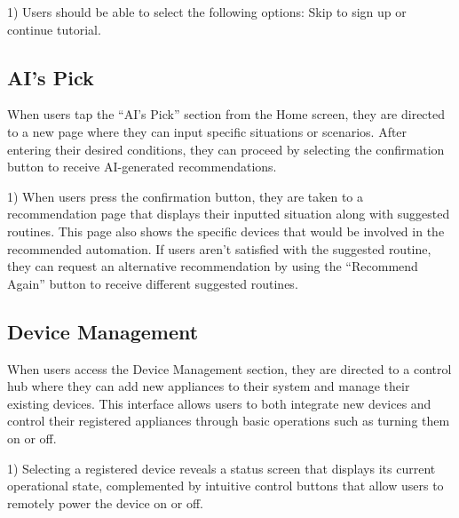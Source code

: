 \documentclass[conference]{IEEEtran}
\begin{document}
1) Users should be able to select the following options: Skip to sign up or continue tutorial.

\vspace{0.7em} %

\subsection{AI's Pick}
\vspace{0.5em}
When users tap the “AI's Pick” section from the Home screen, they are directed to a new page where they can input specific situations or scenarios. After entering their desired conditions, they can proceed by selecting the confirmation button to receive AI-generated recommendations.
\vspace{0.5em}

1) When users press the confirmation button, they are taken to a recommendation page that displays their inputted situation along with suggested routines. This page also shows the specific devices that would be involved in the recommended automation. If users aren't satisfied with the suggested routine, they can request an alternative recommendation by using the “Recommend Again” button to receive different suggested routines.

\vspace{0.7em} %

\subsection{Device Management}
\vspace{0.5em}
When users access the Device Management section, they are directed to a control hub where they can add new appliances to their system and manage their existing devices. This interface allows users to both integrate new devices and control their registered appliances through basic operations such as turning them on or off.
\vspace{0.5em}

1) Selecting a registered device reveals a status screen that displays its current operational state, complemented by intuitive control buttons that allow users to remotely power the device on or off.

\vspace{0.7em} %

\end{document}
